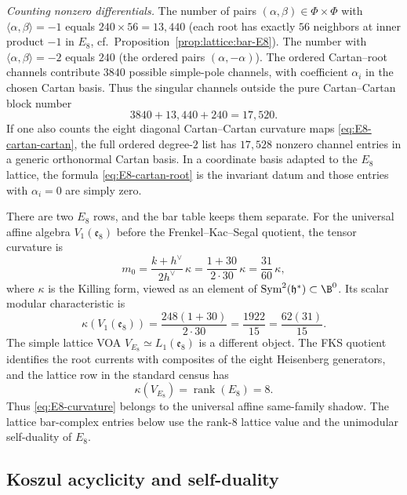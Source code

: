 \begin{computation}
\emph{Counting nonzero differentials.}
The number of pairs $(\alpha, \beta) \in \Phi \times \Phi$ with
$\langle \alpha, \beta \rangle = -1$ equals $240 \times 56 = 13{,}440$
(each root has exactly $56$ neighbors at inner product $-1$ in $E_8$,
cf.\ Proposition~\ref{prop:lattice:bar-E8}).
The number with $\langle \alpha, \beta \rangle = -2$
equals $240$ (the ordered pairs $(\alpha, -\alpha)$). The ordered
Cartan--root channels contribute $3840$ possible simple-pole channels,
with coefficient $\alpha_i$ in the chosen Cartan basis. Thus the
singular channels outside the pure Cartan--Cartan block number
\[
3840 + 13{,}440 + 240 = 17{,}520.
\]
If one also counts the eight diagonal Cartan--Cartan curvature maps
\eqref{eq:E8-cartan-cartan}, the full ordered degree-$2$ list has
$17{,}528$ nonzero channel entries in a generic orthonormal Cartan
basis. In a coordinate basis adapted to the $E_8$ lattice, the
formula \eqref{eq:E8-cartan-root} is the invariant datum and those
entries with $\alpha_i=0$ are simply zero.
\end{computation}

\begin{computation}
\label{comp:E8-curvature}
There are two $E_8$ rows, and the bar table keeps them separate.
For the universal affine algebra $V_1(\mathfrak e_8)$ before the
Frenkel--Kac--Segal quotient, the tensor curvature is
\begin{equation}\label{eq:E8-curvature}
m_0 = \frac{k + h^\vee}{2h^\vee}\,\kappa
= \frac{1 + 30}{2 \cdot 30}\,\kappa
= \frac{31}{60}\,\kappa,
\end{equation}
where $\kappa$ is the Killing form, viewed as an element of
$\mathrm{Sym}^2(\mathfrak{h}^*) \subset \B^0$.
Its scalar modular characteristic is
\[
\kappa(V_1(\mathfrak e_8))
=\frac{248(1+30)}{2\cdot30}
=\frac{1922}{15}
=\frac{62(31)}{15}.
\]
The simple lattice VOA $V_{E_8}\simeq L_1(\mathfrak e_8)$ is a
different object. The FKS quotient identifies the root currents with
composites of the eight Heisenberg generators, and the lattice row in
the standard census has
\[
\kappa(V_{E_8})=\operatorname{rank}(E_8)=8.
\]
Thus \eqref{eq:E8-curvature} belongs to the universal affine
same-family shadow. The lattice bar-complex entries below use the
rank-$8$ lattice value and the unimodular self-duality of $E_8$.
\end{computation}

\subsection{Koszul acyclicity and self-duality}

